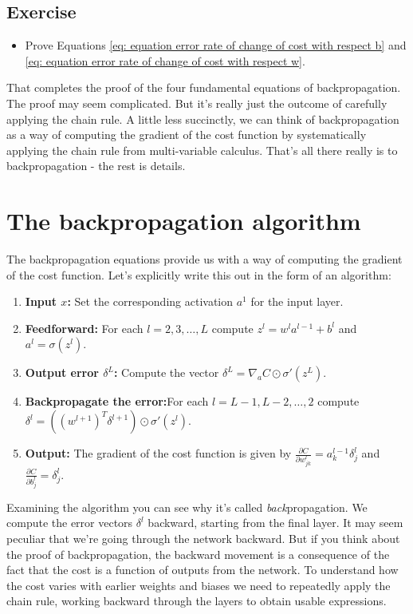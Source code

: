\subsection*{Exercise}
\label{subs: Exercise proof bp3 and bp4}

\begin{itemize}
\item Prove Equations \ref{eq: equation error rate of change of cost with respect b} and \ref{eq: equation error rate of change of cost with respect w}.
\end{itemize}

That completes the proof of the four fundamental equations of backpropagation. The proof may seem complicated. But it's really just the outcome of carefully applying the chain rule. A little less succinctly, we can think of backpropagation as a way of computing the gradient of the cost function by systematically applying the chain rule from multi-variable calculus. That's all there really is to backpropagation - the rest is details.

\section{The backpropagation algorithm}
\label{sec: The backpropagation algorithm}

The backpropagation equations provide us with a way of computing the gradient of the cost function. Let's explicitly write this out in the form of an algorithm:

\begin{enumerate}
\item \textbf{Input $x$:} Set the corresponding activation $a^1$ for the input layer.
\item \textbf{Feedforward:} For each $l=2,3,…,L$ compute $z^l=w^l a^{l-1}+b^l$ and $a^l=\sigma(z^l)$.
\item \textbf{Output error $\delta^L$:} Compute the vector $\delta^L=\nabla_a C \odot \sigma'(z^L)$.
\item \textbf{Backpropagate the error:}For each $l=L-1,L-2,…,2$ compute $\delta^l=((w^{l+1})^T\delta^{l+1})\odot\sigma'(z^l)$.
\item \textbf{Output:} The gradient of the cost function is given by $\frac{\partial C}{\partial w^l_{jk}}=a^{l-1}_k \delta^l_j$ and $\frac{\partial C}{\partial b^l_{j}}=\delta^l_j$.
\end{enumerate}

Examining the algorithm you can see why it's called \textit{back}propagation. We compute the error vectors $\delta^l$ backward, starting from the final layer. It may seem peculiar that we're going through the network backward. But if you think about the proof of backpropagation, the backward movement is a consequence of the fact that the cost is a function of outputs from the network. To understand how the cost varies with earlier weights and biases we need to repeatedly apply the chain rule, working backward through the layers to obtain usable expressions.



